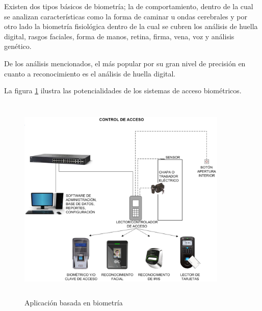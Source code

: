 Existen dos tipos básicos de biometría; la de comportamiento, dentro de la cual se analizan características como la forma de caminar u ondas cerebrales y por otro lado la biometría fisiológica dentro de la cual se cubren los análisis de huella digital, rasgos faciales, forma de manos, retina, firma, vena, voz y análisis genético.

De los análisis mencionados, el más popular por su gran nivel de precisión en cuanto a reconocimiento es el análisis de huella digital.  

La figura \ref{fig:sistemas_bio} ilustra las potencialidades de los sistemas de acceso biométricos.

\begin{figure}[H]
	\centering
	\includegraphics[height=10cm,width=10cm]{./Figures/sistemas_bio.pdf}
	\caption{Aplicación basada en biometría}
	\label{fig:sistemas_bio}
\end{figure}




